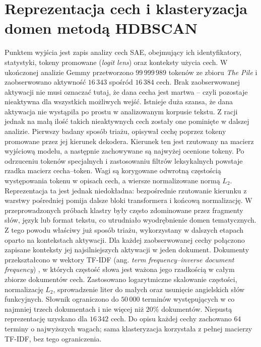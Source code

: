 \section{Reprezentacja cech i klasteryzacja domen metodą HDBSCAN}
\label{sec:triage_klasteryzacja}
Punktem wyjścia jest zapis analizy cech SAE, obejmujący ich identyfikatory, statystyki, tokeny promowane (\textit{logit lens}) oraz konteksty użycia cech. W ukończonej analizie Gemmy przetworzono $99\,999\,989$ tokenów ze zbioru \textit{The Pile} \cite{gao_2020_pile_800gb_dataset_diverse} i zaobserwowano aktywność $16\,343$ spośród $16\,384$ cech. Brak zaobserwowanej aktywacji nie musi oznaczać tutaj, że dana cecha jest martwa -- czyli  pozostaje nieaktywna dla wszystkich możliwych wejść. Istnieje duża szansa, że dana aktywacja nie wystąpiła po prostu w analizowanym korpusie tekstu. Z racji jednak na małą ilość takich nieaktywnych cech zostały one pominięte w dalszej analizie. \newline
Pierwszy badany sposób triażu, opisywał cechę poprzez tokeny promowane przez jej kierunek dekodera. Kierunek ten jest rzutowany na macierz wyjściową modelu, a następnie zachowywane są najwyżej ocenione tokeny. Po odrzuceniu tokenów specjalnych i zastosowaniu filtrów leksykalnych powstaje rzadka macierz cecha--token. Wagi są korygowane odwrotną częstością występowania tokenu w opisach cech, a wiersze normalizowane normą $L_2$. Reprezentacja ta jest jednak niedokładna: bezpośrednie rzutowanie kierunku z warstwy pośredniej pomija dalsze bloki transformera i końcową normalizację. W przeprowadzonych próbach klastry były często zdominowane przez fragmenty słów, język lub format tekstu, co utrudniało wyodrębnienie domen tematycznych. \newline
Z tego powodu właściwy już sposób triażu, wykorzystany w dalszych etapach oparto na kontekstach aktywacji. Dla każdej zaobserwowanej cechy połączono zapisane konteksty jej najsilniejszych aktywacji w jeden dokument. Dokumenty przekształcono w wektory TF-IDF (ang. \textit{term frequency--inverse document frequency}) \cite{salton_1988_term_weighting_approaches_automatic_text_retrieval}, w których częstość słowa jest ważona jego rzadkością w całym zbiorze dokumentów cech. Zastosowano logarytmiczne skalowanie częstości, normalizację $L_2$, sprowadzenie liter do małych oraz usunięcie angielskich słów funkcyjnych. Słownik ograniczono do $50\,000$ terminów występujących w co najmniej trzech dokumentach i nie więcej niż $20\%$ dokumentów. Niepustą reprezentację uzyskano dla $16\,342$ cech. Do opisu każdej cechy zachowano $64$ terminy o najwyższych wagach; sama klasteryzacja korzystała z pełnej macierzy TF-IDF, bez tego ograniczenia. \newline
